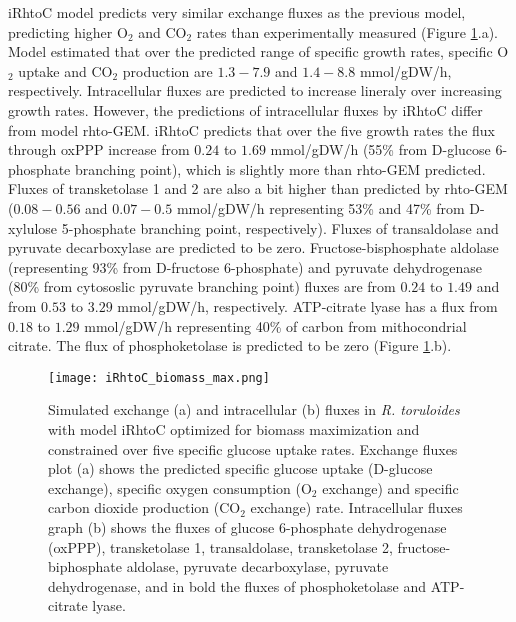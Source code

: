 iRhtoC model predicts very similar exchange fluxes as the previous model, predicting higher O$_2$ and CO$_2$ rates than experimentally measured (Figure \ref{iRhtoC_biomass_max}.a). Model estimated that over the predicted range of specific growth rates, specific O$_2$ uptake and CO$_2$ production are $1.3-7.9$ and $1.4-8.8$ \unit{mmol/gDW/h}, respectively. Intracellular fluxes are predicted to increase lineraly over increasing growth rates. However, the predictions of intracellular fluxes by iRhtoC differ from model rhto-GEM. iRhtoC predicts that over the five growth rates the
flux through oxPPP increase from $0.24$ to $1.69$ \unit{mmol/gDW/h} (55\% from D-glucose 6-phosphate branching point), 
which is slightly more than rhto-GEM predicted.
Fluxes of transketolase 1 and 2 are also a bit higher than predicted by rhto-GEM ($0.08-0.56$ and $0.07-0.5$ \unit{mmol/gDW/h} representing 
53\% and 47\% from D-xylulose 5-phosphate branching point, respectively). 
Fluxes of transaldolase and pyruvate decarboxylase are predicted to be zero. 
Fructose-bisphosphate aldolase (representing 93\% from D-fructose 6-phosphate) and pyruvate dehydrogenase (80\% from cytososlic pyruvate 
branching point) 
fluxes are from $0.24$ to $1.49$ and from $0.53$ to $3.29$ \unit{mmol/gDW/h}, respectively.
ATP-citrate lyase has a flux from $0.18$ to $1.29$ \unit{mmol/gDW/h} representing 40\% of carbon from mithocondrial citrate. The flux of phosphoketolase is predicted to be zero (Figure \ref{iRhtoC_biomass_max}.b).
\begin{figure}[H]
    \centering
    \texttt{[image: iRhtoC\_biomass\_max.png]}
    \caption{Simulated exchange (a) and intracellular (b) fluxes in \textit{R. toruloides} with model iRhtoC optimized for biomass maximization 
    and constrained over five specific glucose uptake rates. Exchange fluxes plot (a) shows the predicted specific glucose uptake (D-glucose exchange), specific oxygen consumption (O$_2$ exchange) and specific carbon dioxide production (CO$_2$ exchange) rate. Intracellular fluxes graph (b) shows the fluxes of glucose 6-phosphate dehydrogenase (oxPPP), transketolase 1, transaldolase, transketolase 2, fructose-biphosphate aldolase, pyruvate decarboxylase, pyruvate dehydrogenase, and in bold the fluxes of phosphoketolase and ATP-citrate lyase.}
    \label{iRhtoC_biomass_max}
\end{figure}

